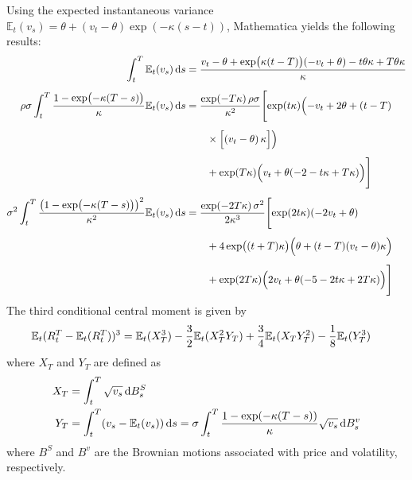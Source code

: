 Using the expected instantaneous variance $\mathbb{E}_t(v_s) = \theta + (v_t - \theta)\exp(-\kappa(s-t))$, Mathematica yields the following results:
\begin{align}
    \int_t^T \mathbb{E}_t(v_s)\,\mathrm{d}s 
    &= \frac{v_t - \theta + \exp\bigl(\kappa(t-T)\bigr)(-v_t+\theta) - t \theta\kappa + T\theta\kappa}{\kappa} \notag \\[1ex]
    \rho\sigma\int_t^T \frac{1-\exp\bigl(-\kappa(T-s)\bigr)}{\kappa}\mathbb{E}_t(v_s)\,\mathrm{d}s 
    &= \frac{\exp(-T\kappa)\,\rho\sigma}{\kappa^2} \Biggl[
        \exp(t\kappa)\Bigl(-v_t+2\theta+(t-T)
        \notag\\[1ex]
    &\quad\quad\times \Bigl[(v_t-\theta)\,\kappa\Bigr]\Bigr) \notag\\[1ex]
    &\quad\quad + \exp(T\kappa)\Bigl(v_t+\theta(-2-t\kappa+T\kappa)\Bigr)
    \Biggr] \notag \\[1ex]
    \sigma^2\int_t^T\frac{\bigl(1-\exp\bigl(-\kappa(T-s)\bigr)\bigr)^2}{\kappa^2}\mathbb{E}_t(v_s) \,\mathrm{d}s 
    &= \frac{\exp(-2T\kappa)\,\sigma^2}{2\kappa^3} \Biggl[
        \exp(2t\kappa)(-2v_t+\theta) \notag\\[1ex]
    &\quad\quad + 4\exp\bigl((t+T)\kappa\bigr)\Bigl(\theta+(t-T)(v_t-\theta)\kappa\Bigr) \notag\\[1ex]
    &\quad\quad + \exp(2T\kappa)\Bigl(2v_t+\theta(-5-2t\kappa+2T\kappa)\Bigr)
    \Biggr] \notag
\end{align}
The third conditional central moment is given by
\begin{align}
    \mathbb{E}_t(R_t^T-\mathbb{E}_t(R_t^T))^3 &= \mathbb{E}_t(X_T^3) - \frac{3}{2}\mathbb{E}_t(X_T^2Y_T) + \frac{3}{4}\mathbb{E}_t(X_TY_T^2) - \frac{1}{8}\mathbb{E}_t(Y_T^3) \notag
\end{align}
where $X_T$ and $Y_T$ are defined as
\begin{align}
    X_T &= \int_t^T \sqrt{v_s}\,\mathrm{d}B_s^S \notag \\
    Y_T &= \int_t^T (v_s - \mathbb{E}_t(v_s))\,\mathrm{d}s = \sigma\int_t^T\frac{1-\exp(-\kappa(T-s))}{\kappa}\sqrt{v_s}\,\mathrm{d}B_s^v \notag
\end{align}
where $B^S$ and $B^v$ are the Brownian motions associated with price and volatility, respectively.

